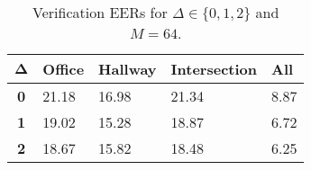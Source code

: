 \begin{table}[h]
    \centering
    \begin{tabular}{|c|M{2cm}|M{2cm}|M{2cm}|M{2cm}|}
    \hline
    $\boldsymbol{\Delta}$ & \bf{Office} & \bf{Hallway} & \bf{Intersection} & \bf{All} \\ 
    \hline 
    \hline
    \bf{0} & 21.18 & 16.98 & 21.34 & 8.87 \\
    \hline
    \bf{1} & 19.02 & 15.28 & 18.87 & 6.72 \\
    \hline
    \bf{2} & 18.67 & 15.82 & 18.48 & 6.25 \\
    \hline
    \end{tabular}
    \caption{Verification EERs for $\Delta \in \{0, 1, 2\}$ and $M = 64$.}
    \label{tab:verify_speakers_M_64}
\end{table}
